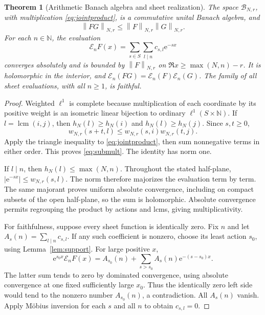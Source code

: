 \documentclass[11pt,a4paper]{article}
\numberwithin{equation}{section}
\newtheorem{theorem}{Theorem}[section]
\theoremstyle{definition}
\theoremstyle{remark}
\newcommand{\N}{\mathbb N}
\newcommand{\B}{\mathcal B}
\newcommand{\ee}{\mathrm e}
\newcommand{\lcm}{\operatorname{lcm}}
\newcommand{\norm}[1]{\left\|#1\right\|}
\begin{document}
\begin{theorem}[Arithmetic Banach algebra and sheet realization]
\label{thm:banach}
The space $\B_{N,r}$, with multiplication \eqref{eq:jointproduct}, is a
commutative unital Banach algebra, and
\begin{equation}
 \norm{FG}_{N,r}\le\norm{F}_{N,r}\norm{G}_{N,r}.
 \label{eq:submult}
\end{equation}
For each $n\in\N$, the evaluation
\begin{equation}
 \mathcal E_nF(x)=\sum_{s\in S}\sum_{l\mid n}c_{s,l}\ee^{-sx}
 \label{eq:eval}
\end{equation}
converges absolutely and is bounded by $\norm{F}_{N,r}$ on
$\Re x\ge\max(N,n)-r$. It is holomorphic in the interior, and
$\mathcal E_n(FG)=\mathcal E_n(F)\mathcal E_n(G)$.
The family of all sheet evaluations, with all $n\ge1$, is faithful.
\end{theorem}
\begin{proof}
Weighted $\ell^1$ is complete because multiplication of each coordinate
by its positive weight is an isometric linear bijection to ordinary
$\ell^1(S\times\N)$. If $l=\lcm(i,j)$, then
$h_N(l)\ge h_N(i)$ and $h_N(l)\ge h_N(j)$. Since $s,t\ge0$,
\[
 w_{N,r}(s+t,l)\le w_{N,r}(s,i)w_{N,r}(t,j).
\]
Apply the triangle inequality to \eqref{eq:jointproduct}, then sum
nonnegative terms in either order. This proves \eqref{eq:submult}.
The identity has norm one.

If $l\mid n$, then $h_N(l)\le\max(N,n)$. Throughout the stated
half-plane, $|\ee^{-sx}|\le w_{N,r}(s,l)$. The norm therefore
majorizes the evaluation term by term. The same majorant proves
uniform absolute convergence, including on compact subsets of the open
half-plane, so the sum is holomorphic. Absolute convergence permits
regrouping the product by actions and lcms, giving multiplicativity.

For faithfulness, suppose every sheet function is identically zero.
Fix $n$ and let $A_s(n)=\sum_{l\mid n}c_{s,l}$. If any such coefficient
is nonzero, choose its least action $s_0$, using Lemma~\ref{lem:support}.
For large positive $x$,
\[
 \ee^{s_0x}\mathcal E_nF(x)
 =A_{s_0}(n)+\sum_{s>s_0}A_s(n)\ee^{-(s-s_0)x}.
\]
The latter sum tends to zero by dominated convergence, using absolute
convergence at one fixed sufficiently large $x_0$. Thus the identically
zero left side would tend to the nonzero number $A_{s_0}(n)$, a
contradiction. All $A_s(n)$ vanish. Apply M\"obius inversion for each
$s$ and all $n$ to obtain $c_{s,l}=0$.
\end{proof}
\end{document}
